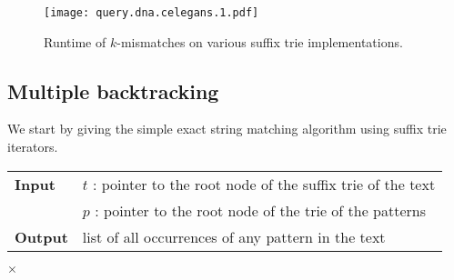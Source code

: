 \begin{figure}[h]
\begin{center}
\caption[$k$-mismatches runtime]{Runtime of $k$-mismatches on various suffix trie implementations.}
\label{fig:query-dna-apx}
\texttt{[image: query.dna.celegans.1.pdf]}
\end{center}
\end{figure}


\subsection{Multiple backtracking}

We start by giving the simple exact string matching algorithm using suffix trie iterators.

\begin{center}
\begin{minipage}[t]{.8\textwidth}
\begin{algorithm}[H]
\begin{tabular}{ll}
\textbf{Input}  & $t$ : pointer to the root node of the suffix trie of the text\\
 			    & $p$ : pointer to the root node of the trie of the patterns\\
\textbf{Output} & list of all occurrences of any pattern in the text\\
\end{tabular}
\begin{algorithmic}[1]
	\State \Report {} $\times$ 
\Else
	\State {}
	\Repeat
			\State {}
			\State {}
		\EndIf
\EndIf
\end{algorithmic}
\label{alg:st-exact-multi}
\end{algorithm}
\end{minipage}
\end{center}

